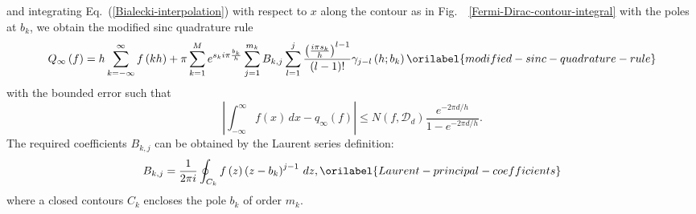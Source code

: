 \documentclass[aps,showkeys,noshowpacs,superscriptaddress,pre,preprint]{revtex4-2}
\let\label\orilabel
\begin{document}
and integrating Eq.~(\ref{Bialecki-interpolation}) with respect to $x$ along the contour
as in Fig.~~\ref{Fermi-Dirac-contour-integral} with the poles at $b_k$,
we obtain the modified sinc quadrature rule
\begin{equation}
{Q_\infty \left( f \right)} = h \sum_{k = -\infty}^{\infty} {f \left( k h \right)}
+ \pi \sum_{k = 1}^{M} e^{s_k i \pi \frac{b_k}{h}}
\sum_{j = 1}^{m_k} B_{k,j} \sum_{l = 1}^{j}
\frac{ \left( \frac{i \pi {s_k}}{h} \right)^{l-1}}{\left( l - 1 \right) !} \gamma_{j-l} \left( h; b_k \right)
\label{modified-sinc-quadrature-rule}
\end{equation}
with the bounded error such that
\begin{equation*}
\left\vert \int_{-\infty}^{\infty} {f(x)} \, dx - q_\infty (f) \right\vert
\le N \left( f, \mathcal{D}_d \right)
\frac{e^{-2\pi d /h}}{1 - e^{-2\pi d /h}} .
\end{equation*}
The required coefficients $B_{k, j}$ can be obtained by the Laurent series definition:
\begin{equation}
B_{k,j} = \frac{1}{2 \pi i} \oint_{C_k} {f \left( z \right)} \left( z - b_k \right)^{j - 1} \, dz ,
\label{Laurent-principal-coefficients}
\end{equation}
where a closed contours $C_k$ encloses the pole $b_k$ of order $m_k$.
\end{document}
